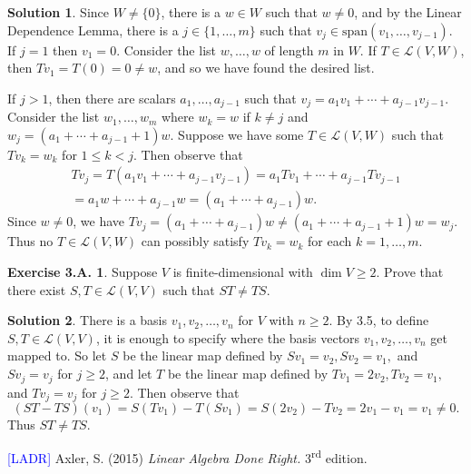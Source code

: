 \documentclass[12pt]{article}
\theoremstyle{definition}
\theoremstyle{exercise}
\newtheorem{exercise}{Exercise 3.A.}
\theoremstyle{solution}
\newtheorem*{solution}{Solution}
\newcommand{\lmap}{\mathcal{L}}
\newcommand{\ts}{\textsuperscript}
\newcommand{\Span}{\text{span}}
\begin{document}
\begin{solution}
    Since \( W \neq \{ 0 \} \), there is a \( w \in W \) such that \( w \neq 0 \), and by the Linear Dependence Lemma, there is a \( j \in \{ 1, \ldots, m \} \) such that \( v_j \in \Span(v_1, \ldots, v_{j-1}) \). If \( j = 1 \) then \( v_1 = 0 \). Consider the list \( w, \ldots, w \) of length \( m \) in \( W \). If \( T \in \lmap(V, W) \), then \( T v_1 = T(0) = 0 \neq w \), and so we have found the desired list.
    
    If \( j > 1 \), then there are scalars \( a_1, \ldots, a_{j-1} \) such that \( v_j = a_1 v_1 + \cdots + a_{j-1} v_{j-1} \).  Consider the list \( w_1, \ldots, w_m \) where \( w_k = w \) if \( k \neq j \) and \( w_j = (a_1 + \cdots + a_{j-1} + 1) w \). Suppose we have some \( T \in \lmap(V, W) \) such that \( T v_k = w_k \) for \( 1 \leq k < j \). Then observe that
    \begin{multline*}
        T v_j = T(a_1 v_1 + \cdots + a_{j-1} v_{j-1}) = a_1 T v_1 + \cdots + a_{j-1} T v_{j-1} \\ = a_1 w + \cdots + a_{j-1} w = (a_1 + \cdots + a_{j-1}) w.
    \end{multline*}
    Since \( w \neq 0 \), we have \( T v_j = (a_1 + \cdots + a_{j-1}) w \neq (a_1 + \cdots + a_{j-1} + 1) w = w_j \). Thus no \( T \in \lmap(V, W) \) can possibly satisfy \( T v_k = w_k \) for each \( k = 1, \ldots, m \).
\end{solution}

\begin{exercise}
\label{ex:14}
    Suppose \( V \) is finite-dimensional with \( \dim V \geq 2 \). Prove that there exist \( S, T \in \lmap(V, V) \) such that \( ST \neq TS \).
\end{exercise}

\begin{solution}
    There is a basis \( v_1, v_2, \ldots, v_n \) for \( V \) with \( n \geq 2 \). By 3.5, to define \( S, T \in \lmap(V, V) \), it is enough to specify where the basis vectors \( v_1, v_2, \ldots, v_n \) get mapped to. So let \( S \) be the linear map defined by \( S v_1 = v_2, S v_2 = v_1, \) and \( S v_j = v_j \) for \( j \geq 2 \), and let \( T \) be the linear map defined by \( T v_1 = 2 v_2, T v_2 = v_1, \) and \( T v_j = v_j \) for \( j \geq 2 \). Then observe that
    \[
        (ST - TS)(v_1) = S(T v_1) - T(S v_1) = S(2 v_2) - T v_2 = 2 v_1 - v_1 = v_1 \neq 0.
    \]
    Thus \( ST \neq TS \).
\end{solution}

\noindent \hrulefill

\noindent \hypertarget{ladr}{\textcolor{blue}{[LADR]} Axler, S. (2015) \textit{Linear Algebra Done Right.} 3\ts{rd} edition.}
\end{document}
